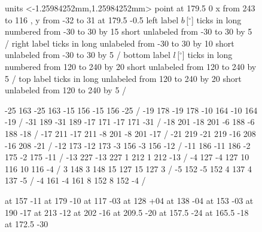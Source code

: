 \documentclass[useAMS,usenatbib]{mn2e}
\begin{document}
\begin{figure}
\beginpicture
\setcoordinatesystem units <-1.25984252mm,1.25984252mm> point at 179.5 0
\setplotarea x from 243 to 116 , y from -32 to  31
 at 179.5 -0.5
\axis left label {$b$\,[$^\circ$]}
ticks in long numbered from -30 to 30 by 15
      short unlabeled from -30 to 30 by 5 /
\axis right label {}
ticks in long unlabeled from -30 to 30 by 10
      short unlabeled from -30 to 30 by 5 /
\axis bottom label {$l$\,[$^\circ$]}
ticks in long numbered from 120 to 240 by 20
      short unlabeled from 120 to 240 by 5 /
\axis top label {}
ticks in long unlabeled from 120 to 240 by 20
      short unlabeled from 120 to 240 by 5 /

 -25 163 -25 163 -15 156 -15 156 -25 /
 -19 178 -19 178 -10 164 -10 164 -19 /
 -31 189 -31 189 -17 171 -17 171 -31 /
 -18 201 -18 201  -6 188  -6 188 -18 /
 -17 211 -17 211  -8 201  -8 201 -17 /
 -21 219 -21 219 -16 208 -16 208 -21 /
 -12 173 -12 173  -3 156  -3 156 -12 /
 -11 186 -11 186  -2 175  -2 175 -11 /
 -13 227 -13 227   1 212   1 212 -13 /
 -4 127 -4 127 10 116 10 116 -4 /
  3 148  3 148 15 127 15 127  3 /
 -5 152 -5 152  4 137  4 137 -5 /
 -4 161 -4 161  8 152  8 152 -4 /

 at 157   -11
 at 179   -10
 at 117   -03
 at 128   +04
 at 138   -04
 at 153   -03
 at 190   -17
 at 213   -12
 at 202   -16
 at 209.5 -20
 at 157.5 -24
 at 165.5 -18
 at 172.5 -30
	     	 

\end{figure}
\end{document}
